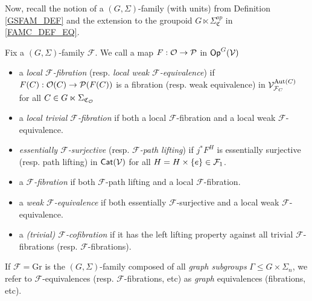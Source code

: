 \documentclass[a4paper,10pt
,draft
]{article}%
\renewcommand{\F}{\mathcal F}
\renewcommand{\1}{\eta}%
\begin{document}
Now, recall the notion of a $(G, \Sigma)$-family (with units) from Definition \ref{GSFAM_DEF}
and the extension to the groupoid $G \ltimes \Sigma_{\mathfrak C}^{op}$ in \eqref{FAMC_DEF_EQ}.


\begin{definition}
      \label{MODEL_DEFN}
      Fix a $(G, \Sigma)$-family $\F$.
      We call a map $F: \mathcal{O} \to \mathcal{P}$ in $\mathsf{Op}^G(\mathcal V)$
      \begin{itemize}
      \item a {\em local $\F$-fibration} (resp. {\em local weak $\F$-equivalence}) if
            $F(C): \mathcal{O}(C)\to \mathcal{P}(F(C))$
            is a fibration (resp. weak equivalence) in $\V^{\Aut(C)}_{\F_C}$ for all $C \in G \ltimes \Sigma_{\mathfrak C_{\mathcal{O}}}$
      \item a {\em local trivial $\F$-fibration} if both a local $\F$-fibration and a local weak $\F$-equivalence.
      \item {\em essentially $\F$-surjective} (resp. {\em $\F$-path lifting}) if $j^*F^H$ is essentially surjective (resp. path lifting) in $\mathsf{Cat}(\mathcal V)$ for all $H = H \times \set{e} \in \F_1$.
      \item a {\em $\F$-fibration} if both $\F$-path lifting and a local $\F$-fibration.
      \item a {\em weak $\F$-equivalence} if both essentially $\F$-surjective and a local weak $\F$-equivalence.
      \item a \textit{(trivial) $\F$-cofibration} if it has the left lifting property against all trivial $\F$-fibrations (resp. $\F$-fibrations).
      \end{itemize}
\end{definition}

\begin{remark}
      \label{GRAPHF_REM}
      If $\F = \mathrm{Gr}$ is the $(G, \Sigma)$-family composed of all \textit{graph subgroups} $\Gamma \leq G \times \Sigma_n$,
      we refer to $\F$-equivalences (resp. $\F$-fibrations, etc) as \textit{graph} equivalences (fibrations, etc).
\end{remark}

\end{document}
